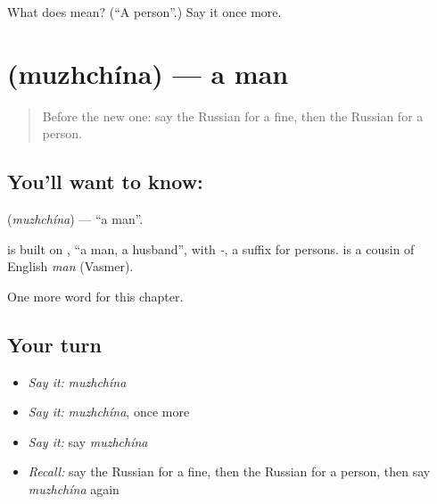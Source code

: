 \begin{tcolorbox}[breakable,colback=teal!4,colframe=teal!35!black,title={Before you move on}]
What does  mean? (\textquotedblleft{}A person\textquotedblright{}.) Say it once more.
\end{tcolorbox}
\section[\texorpdfstring{\ru{мужчина} (muzhchína)}{мужчина (muzhchína)}]{ (muzhchína) — a man}

\label{lesson:RU-C227-muzhchina}



\begin{quote}
Before the new one: say the Russian for a fine, then the Russian for a person.
\end{quote}

\subsection*{You'll want to know: }
\textbf{} (\emph{muzhchína}) — \textquotedblleft{}a man\textquotedblright{}.

\begin{cousinweb}
\textbf{} is built on \emph{}, \textquotedblleft{}a man, a husband\textquotedblright{}, with \emph{-}, a suffix for persons. \emph{} is a cousin of English \emph{man} (Vasmer).
\end{cousinweb}

\begin{grammarlens}[title={What you've built}]
One more word for this chapter.
\end{grammarlens}

\subsection*{Your turn}
\begin{itemize}
\raggedright
  \item \emph{Say it:} \emph{muzhchína}
  \item \emph{Say it:} \emph{muzhchína}, once more
  \item \emph{Say it:} say \emph{muzhchína}
  \item \emph{Recall:} say the Russian for a fine, then the Russian for a person, then say \emph{muzhchína} again
\end{itemize}

